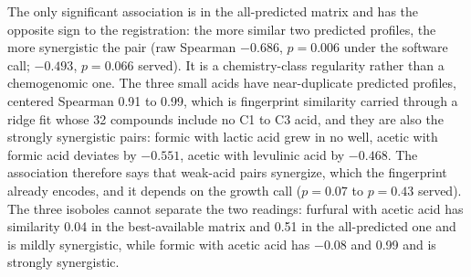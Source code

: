 The only significant association is in the all-predicted matrix and has the opposite sign
to the registration: the more similar two predicted profiles, the more synergistic the
pair (raw Spearman $-0.686$, $p = 0.006$ under the software call; $-0.493$, $p = 0.066$
served). It is a chemistry-class regularity rather than a chemogenomic one. The three
small acids have near-duplicate predicted profiles, centered Spearman 0.91 to 0.99, which
is fingerprint similarity carried through a ridge fit whose 32 compounds include no C1 to
C3 acid, and they are also the strongly synergistic pairs: formic with lactic acid grew in
no well, acetic with formic acid deviates by $-0.551$, acetic with levulinic acid by
$-0.468$. The association therefore says that weak-acid pairs synergize, which the
fingerprint already encodes, and it depends on the growth call ($p = 0.07$ to $p = 0.43$
served). The three isoboles cannot separate the two readings: furfural with acetic acid
has similarity 0.04 in the best-available matrix and 0.51 in the all-predicted one and is
mildly synergistic, while formic with acetic acid has $-0.08$ and 0.99 and is strongly
synergistic.

\begin{table}[htbp]
\centering
\footnotesize
\caption[]{Profile similarity against the pair deviation from Bliss, over the 15 pairs. A
negative Spearman means similar profiles deviate further below Bliss, which is the
opposite of the registered direction. Permutation $p$ is over 10,000 draws and is set in
bold below 0.05. The last column counts the pairs whose two profiles are both
predictions, which is where the fingerprint regularity of the small acids enters.}
\label{tab:similarity}

\end{table}


